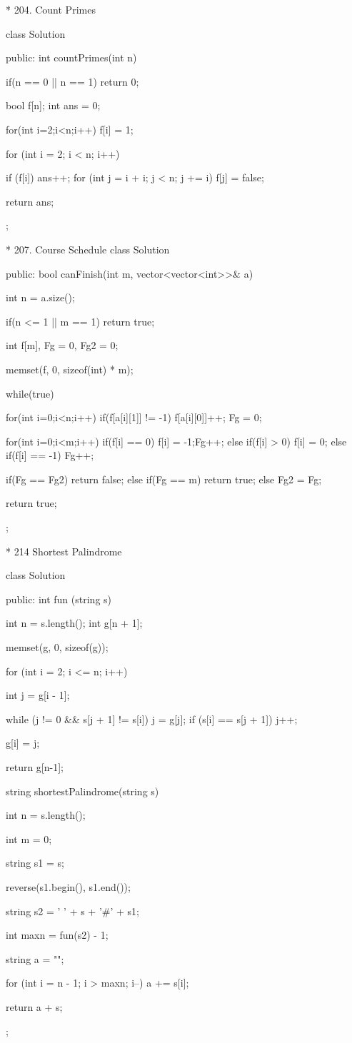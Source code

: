 
* 204. Count Primes

		class Solution {
		public:
			int countPrimes(int n) {
				if(n == 0 || n == 1)
					return 0;
				
				bool f[n];
				int ans = 0;
				
				for(int i=2;i<n;i++){
					f[i] = 1;
				}
				
				for (int i = 2; i < n; i++) {
					if (f[i]){
						ans++;
						for (int j = i + i; j < n; j += i) 
							f[j] = false;
					}

				}
				return ans;
			}
		};

* 207. Course Schedule
		class Solution {
		public:
			bool canFinish(int m, vector<vector<int>>& a) {
				int n = a.size();
				
				if(n <= 1 || m == 1)
					return true;
				
				int f[m], Fg = 0, Fg2 = 0;
				
				memset(f, 0, sizeof(int) * m);
				
				while(true){
					for(int i=0;i<n;i++){
						if(f[a[i][1]] != -1){
							f[a[i][0]]++;
						}
					}
					Fg = 0;
					
					for(int i=0;i<m;i++){
						if(f[i] == 0){
							f[i] = -1;Fg++;
						}
						else if(f[i] > 0){
							f[i] = 0;
						}
						else if(f[i] == -1){
							Fg++;
						}
					}
					

					if(Fg == Fg2)
						return false;
					else if(Fg == m){
						return true;
					}
					else Fg2 = Fg;
				}
				return true;

			}
		};

* 214 Shortest Palindrome

	class Solution {
	public:
			int fun (string s) {
					int n = s.length();
					int g[n + 1];

					memset(g, 0, sizeof(g));
					
					for (int i = 2; i <= n; i++) {
							int j = g[i - 1];

							while (j != 0 && s[j + 1] != s[i]) {
									j = g[j];
							}
							if (s[i] == s[j + 1])
									j++;

							g[i] = j;
					}



					return g[n-1];
			}


			string shortestPalindrome(string s) {
					int n = s.length();

					int m = 0;

					string s1 = s;

					reverse(s1.begin(), s1.end());

					string s2 = ' ' + s + '#' + s1;

					int maxn = fun(s2) - 1;
					

					string a = "";

					for (int i = n - 1; i > maxn; i--) {
							a += s[i];
					}

					return a + s;
			}
	};

